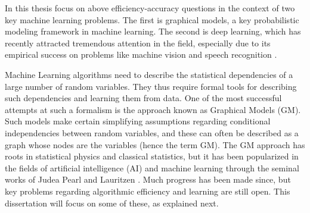 In this thesis  focus on above efficiency-accuracy questions in the context of two key machine learning problems. The first is graphical models, a key probabilistic modeling framework in machine learning. The second is deep learning, which has recently attracted tremendous attention in the field, especially due to its empirical success on problems like machine vision \cite{krizhevsky2012imagenet} and speech recognition \cite{hinton2012deep}.


Machine Learning algorithms need to describe the statistical dependencies of a large number of random variables. They thus require formal tools for describing
such dependencies and learning them from data. One of the most successful attempts at such a formalism is the approach known as Graphical Models (GM). Such models make certain simplifying assumptions regarding conditional independencies between random variables, and these can often be described as a graph whose nodes are the variables (hence the term GM). The GM approach has roots in statistical physics and classical statistics, but it has been popularized in the fields of artificial intelligence (AI) and machine learning through the seminal works of Judea Pearl  \cite{pearl1986fusion} and Lauritzen  \cite{lauritzen1988local}.
Much progress has been made since, but key problems regarding algorithmic efficiency and learning are still open.
This dissertation will focus on some of these, as explained next.      



